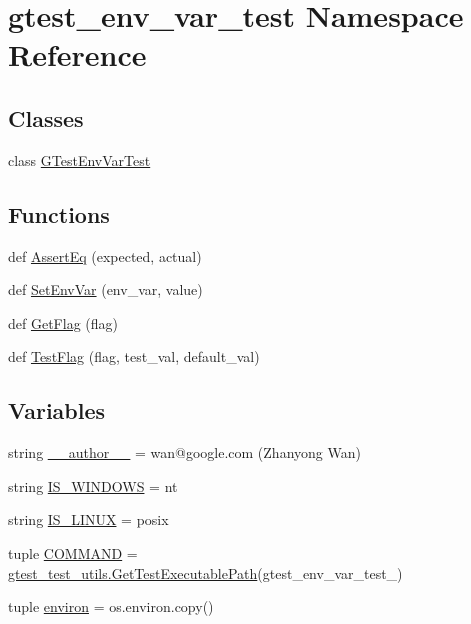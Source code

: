 \hypertarget{namespacegtest__env__var__test}{}\section{gtest\+\_\+env\+\_\+var\+\_\+test Namespace Reference}
\label{namespacegtest__env__var__test}
\subsection*{Classes}
\begin{DoxyCompactItemize}
\item 
class \hyperlink{classgtest__env__var__test_1_1_g_test_env_var_test}{G\+Test\+Env\+Var\+Test}
\end{DoxyCompactItemize}
\subsection*{Functions}
\begin{DoxyCompactItemize}
\item 
def \hyperlink{namespacegtest__env__var__test_a8c94a5abd1117cdd2b402c0059a49a3a}{Assert\+Eq} (expected, actual)
\item 
def \hyperlink{namespacegtest__env__var__test_a634ee0fa1ccf4713411992e7373e49e9}{Set\+Env\+Var} (env\+\_\+var, value)
\item 
def \hyperlink{namespacegtest__env__var__test_a79d5f78f47c7dde37a0941d8604cf857}{Get\+Flag} (flag)
\item 
def \hyperlink{namespacegtest__env__var__test_aa7bb6bbb50ba35349bbdae6d881faee8}{Test\+Flag} (flag, test\+\_\+val, default\+\_\+val)
\end{DoxyCompactItemize}
\subsection*{Variables}
\begin{DoxyCompactItemize}
\item 
string \hyperlink{namespacegtest__env__var__test_a8a712438470c76f2144c66dcee28e326}{\+\_\+\+\_\+author\+\_\+\+\_\+} = \textquotesingle{}wan@google.\+com (Zhanyong Wan)\textquotesingle{}
\item 
string \hyperlink{namespacegtest__env__var__test_af792d1403a09d46bffcd3466821cd0fb}{I\+S\+\_\+\+W\+I\+N\+D\+O\+W\+S} = \textquotesingle{}nt\textquotesingle{}
\item 
string \hyperlink{namespacegtest__env__var__test_a33b1e2e9afe9d59d75503de4a1297486}{I\+S\+\_\+\+L\+I\+N\+U\+X} = \textquotesingle{}posix\textquotesingle{}
\item 
tuple \hyperlink{namespacegtest__env__var__test_a6c739e8ac3f4f184d9351af775d26496}{C\+O\+M\+M\+A\+N\+D} = \hyperlink{namespacegtest__test__utils_a1bdf3cac86afa675ed37629b183048e9}{gtest\+\_\+test\+\_\+utils.\+Get\+Test\+Executable\+Path}(\textquotesingle{}gtest\+\_\+env\+\_\+var\+\_\+test\+\_\+\textquotesingle{})
\item 
tuple \hyperlink{namespacegtest__env__var__test_a5cfdb73835d2006b40151861d9fd1e7c}{environ} = os.\+environ.\+copy()
\end{DoxyCompactItemize}


